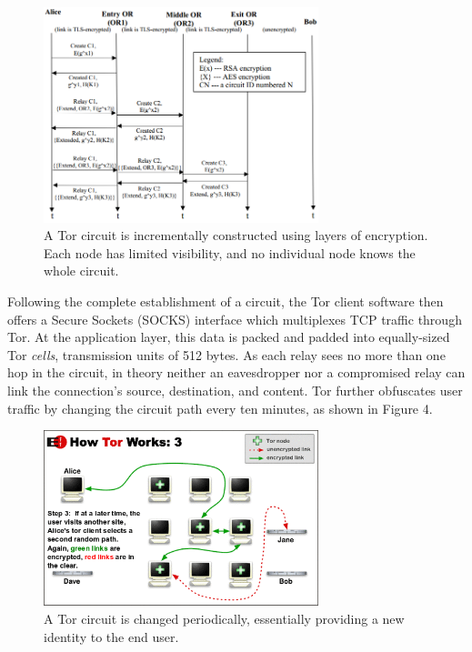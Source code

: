 \documentclass[journal]{IEEEtran}
\begin{document}
\begin{figure}[htbp]
\centering
\begin{minipage}{8 cm}
    \includegraphics[width=80mm]{resources/circuit-construction.png}
    \caption{A Tor circuit is incrementally constructed using layers of encryption. Each node has limited visibility, and no individual node knows the whole circuit.\cite{TorOverview}}
\end{minipage}
\end{figure}

Following the complete establishment of a circuit, the Tor client software then offers a Secure Sockets (SOCKS) interface which multiplexes TCP traffic through Tor. At the application layer, this data is packed and padded into equally-sized Tor \textit{cells}, transmission units of 512 bytes. As each relay sees no more than one hop in the circuit, in theory neither an eavesdropper nor a compromised relay can link the connection's source, destination, and content. Tor further obfuscates user traffic by changing the circuit path every ten minutes,\cite{McCoy2008} as shown in Figure 4.

\begin{figure}[htbp]
\centering
\begin{minipage}{8 cm}
  \includegraphics[width=80mm]{resources/circuit-change.png}
  \caption{A Tor circuit is changed periodically, essentially providing a new identity to the end user.\cite{TorOverview}}
\end{minipage}
\end{figure}
\end{document}

